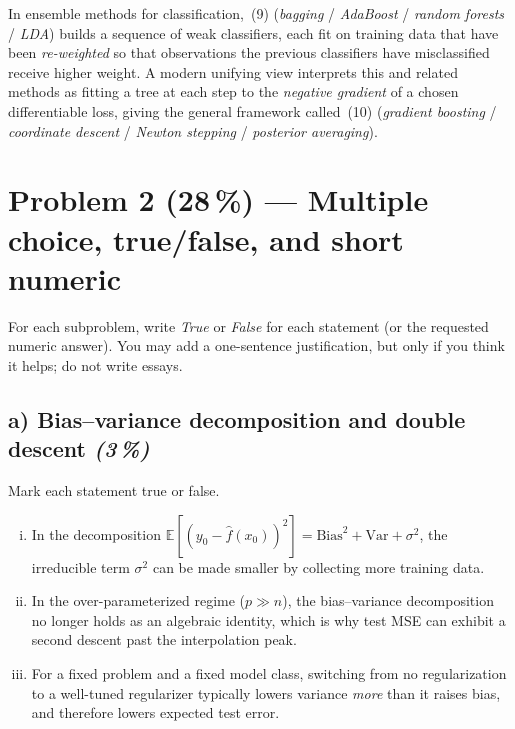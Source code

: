 \documentclass[11pt,a4paper]{article}
\newcommand{\points}[1]{\textbf{(#1\,\%)}}
\newcommand{\subpoints}[1]{\textit{(#1\,\%)}}
\begin{document}
In ensemble methods for classification, \underline{\hspace{2.5cm}}\,(9) (\emph{bagging} / \emph{AdaBoost} / \emph{random forests} / \emph{LDA}) builds a sequence of weak classifiers, each fit on training data that have been \emph{re-weighted} so that observations the previous classifiers have misclassified receive higher weight. A modern unifying view interprets this and related methods as fitting a tree at each step to the \emph{negative gradient} of a chosen differentiable loss, giving the general framework called \underline{\hspace{2.5cm}}\,(10) (\emph{gradient boosting} / \emph{coordinate descent} / \emph{Newton stepping} / \emph{posterior averaging}).

\vfill\eject

\section*{Problem 2 \points{28} --- Multiple choice, true/false, and short numeric}

For each subproblem, write \emph{True} or \emph{False} for each statement (or the requested numeric answer). You may add a one-sentence justification, but only if you think it helps; do not write essays.

\subsection*{a) Bias--variance decomposition and double descent \subpoints{3}}
Mark each statement true or false.
\begin{enumerate}[(i)]
  \item In the decomposition $\mathbb{E}[(y_0 - \hat f(x_0))^2] = \mathrm{Bias}^2 + \mathrm{Var} + \sigma^2$, the irreducible term $\sigma^2$ can be made smaller by collecting more training data.
  \item In the over-parameterized regime ($p \gg n$), the bias--variance decomposition no longer holds as an algebraic identity, which is why test MSE can exhibit a second descent past the interpolation peak.
  \item For a fixed problem and a fixed model class, switching from no regularization to a well-tuned regularizer typically lowers variance \emph{more} than it raises bias, and therefore lowers expected test error.
\end{enumerate}
\end{document}
